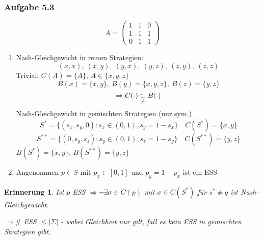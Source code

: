 \documentclass[12pt]{extreport} %
\theoremstyle{named}
\theoremstyle{itshape}
\theoremstyle{normal}
\newtheorem*{erinnerung}{Erinnerung}
\begin{document}
\subsubsection*{Aufgabe 5.3}
$$A = \begin{pmatrix} 1 & 1 & 0 \\ 1& 1 & 1 \\ 0 & 1 & 1 \end{pmatrix}$$   
\begin{enumerate}
	\item Nash-Gleichgewicht in reinen Strategien:
		$$ (x,x), ~(x,y), ~(y,x), ~(y,z), ~(z, y),  ~(z,z) $$
		Trivial: $C(A) = \{ A \}$, $A \in \{ x,y,z\}$
		$$ B(x) = \{x,y\}, ~B(y) = \{x, y,z\}, ~B(z) = \{ y, z \} $$
		$$ \Rightarrow C(\cdot) \underset{\not-}{\subset} B(\cdot) $$
		Nash-Gleichgewicht in gemischten Strategien (nur sym.)
		$$ S^{*} = \{ (s_x, s_y, 0) : s_x \in (0, 1), s_y = 1 - s_x \} \quad C(S^{*}) = \{x, y\} $$
		$$ S^{**} = \{ (0, s_y, s_z) : s_y \in (0, 1), s_z = 1 - s_y \} \quad C(S^{**}) = \{y, z\} $$
		$B(S^{*}) = \{ x, y \}$, $B(S^{**}) = \{y, z \}$
	\item Angenommen $p \in S$ mit $p_x \in [0, 1]$ und $p_y = 1 - p_x$ ist ein ESS
\end{enumerate}


\begin{erinnerung}
	Ist $p$ ESS $\Rightarrow \neg \exists \sigma \in C(p)$ mit $\sigma \in C(S^{*})$ für $s^{*} \neq q$ ist Nash-Gleichgewicht.

	$\Rightarrow \#$ ESS $\leq \left| \Sigma \right|$ - wobei Gleichheit nur gilt, fall es kein ESS in gemischten Strategien gibt.
\end{erinnerung}


\printindex
\end{document}
